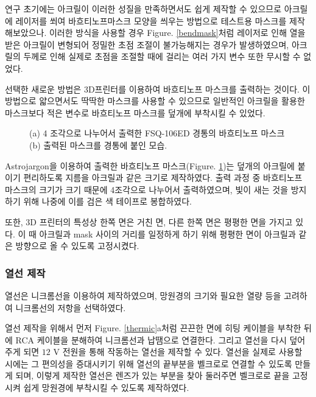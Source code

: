 연구 초기에는 아크릴이 이러한 성질을 만족하면서도 쉽게 제작할 수 있으므로 아크릴에 레이저를 쐬여 바흐티노프마스크 모양을 씌우는 방법으로 테스트용 마스크를 제작해보았으나. 이러한 방식을 사용할 경우 \textrm{Figure}. \ref{bendmask}처럼 레이저로 인해 열을 받은 아크릴이 변형되어 정밀한 초점 조절이 불가능해지는 경우가 발생하였으며, 아크릴의 두께로 인해 실제로 초점을 조절할 때에 걸리는 여러 가지 변수 또한 무시할 수 없었다.

선택한 새로운 방법은 3D프린터를 이용하여 바흐티노프 마스크를 출력하는 것이다. 이 방법으로 얇으면서도 딱딱한 마스크를 사용할 수 있으므로 일반적인 아크릴을 활용한 마스크보다 적은 변수로 바흐티노프 마스크를 덮개에 부착시킬 수 있었다.

\begin{figure}[ht]
	\begin{center}
	\end{center}
	\caption{(a) 4 조각으로 나누어서 출력한 FSQ-106ED 경통의 바흐티노프 마스크 (b) 출력된 마스크를 경통에 붙인 모습.}
	\label{mask}
\end{figure}

Astrojargon을 이용하여 출력한 바흐티노프 마스크(\textrm{Figure}. \ref{mask})는 덮개의 아크릴에 붙이기 편리하도록 지름을 아크릴과 같은 크기로 제작하였다. 출력 과정 중 바흐티노프 마스크의 크기가 크기 때문에 4조각으로 나누어서 출력하였으며, 빛이 새는 것을 방지하기 위해 나중에 이를 검은 색 테이프로 봉합하였다. 

또한, 3D 프린터의 특성상 한쪽 면은 거친 면, 다른 한쪽 면은 평평한 면을 가지고 있다. 이 때 아크릴과 mask 사이의 거리를 일정하게 하기 위해 평평한 면이 아크릴과 같은 방향으로 올 수 있도록 고정시켰다.

\subsubsection{열선 제작}

열선은  니크롬선을 이용하여 제작하였으며, 망원경의 크기와 필요한 열량 등을 고려하여 니크롬선의 저항을 선택하였다.

열선 제작을 위해서 먼저 \textrm{Figure}. \ref{thermic}a처럼 끈끈한 면에 히팅 케이블을 부착한 뒤에 RCA 케이블을  분해하여 니크롬선과 납땜으로 연결한다. 그리고 열선을 다시 덮어주게 되면 $12 \textrm{ V}$ 전원을 통해 작동하는 열선을 제작할 수 있다. 열선을 실제로 사용할 시에는 그 편의성을 증대시키기 위해 열선의 끝부분을 벨크로로 연결할 수 있도록 만들게 되며, 이렇게 제작한 열선은 렌즈가 있는 부분을 찾아 둘러주면 벨크로로 끝을 고정시켜 쉽게 망원경에 부착시킬 수 있도록 제작하였다.

